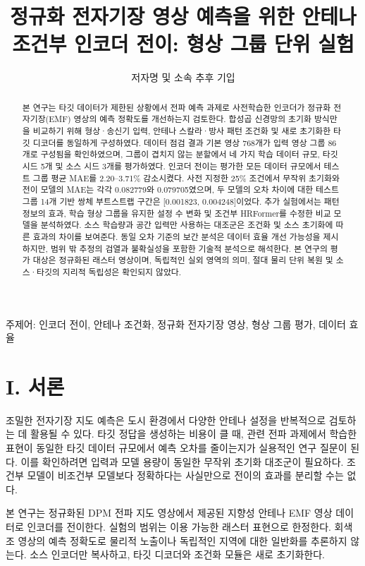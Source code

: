 \documentclass[10pt,a4paper]{article}
\title{정규화 전자기장 영상 예측을 위한 안테나 조건부 인코더 전이: 형상 그룹 단위 실험}
\author{저자명 및 소속 추후 기입}
\date{}
\begin{document}
\maketitle
\begin{abstract}
본 연구는 타깃 데이터가 제한된 상황에서 전파 예측 과제로 사전학습한 인코더가 정규화 전자기장(EMF) 영상의 예측 정확도를 개선하는지 검토한다. 합성곱 신경망의 초기화 방식만을 비교하기 위해 형상·송신기 입력, 안테나 스칼라·방사 패턴 조건화 및 새로 초기화한 타깃 디코더를 동일하게 구성하였다. 데이터 점검 결과 기본 영상 768개가 입력 영상 그룹 86개로 구성됨을 확인하였으며, 그룹이 겹치지 않는 분할에서 네 가지 학습 데이터 규모, 타깃 시드 5개 및 소스 시드 3개를 평가하였다. 인코더 전이는 평가한 모든 데이터 규모에서 테스트 그룹 평균 MAE를 2.20–3.71\% 감소시켰다. 사전 지정한 25\% 조건에서 무작위 초기화와 전이 모델의 MAE는 각각 0.082779와 0.079705였으며, 두 모델의 오차 차이에 대한 테스트 그룹 14개 기반 쌍체 부트스트랩 구간은 [0.001823, 0.004248]이었다. 추가 실험에서는 패턴 정보의 효과, 학습 형상 그룹을 유지한 설정 수 변화 및 조건부 HRFormer를 수정한 비교 모델을 분석하였다. 소스 학습량과 공간 입력만 사용하는 대조군은 조건화 및 소스 초기화에 따른 효과의 차이를 보여준다. 동일 오차 기준의 보간 분석은 데이터 효율 개선 가능성을 제시하지만, 범위 밖 추정의 검열과 불확실성을 포함한 기술적 분석으로 해석한다. 본 연구의 평가 대상은 정규화된 래스터 영상이며, 독립적인 실외 영역의 의미, 절대 물리 단위 복원 및 소스·타깃의 지리적 독립성은 확인되지 않았다.
\end{abstract}
\noindent 주제어: 인코더 전이, 안테나 조건화, 정규화 전자기장 영상, 형상 그룹 평가, 데이터 효율
\section*{I. 서론}
조밀한 전자기장 지도 예측은 도시 환경에서 다양한 안테나 설정을 반복적으로 검토하는 데 활용될 수 있다. 타깃 정답을 생성하는 비용이 클 때, 관련 전파 과제에서 학습한 표현이 동일한 타깃 데이터 규모에서 예측 오차를 줄이는지가 실용적인 연구 질문이 된다. 이를 확인하려면 입력과 모델 용량이 동일한 무작위 초기화 대조군이 필요하다. 조건부 모델이 비조건부 모델보다 정확하다는 사실만으로 전이의 효과를 분리할 수는 없다.

본 연구는 정규화된 DPM 전파 지도 영상에서 제공된 지향성 안테나 EMF 영상 데이터로 인코더를 전이한다. 실험의 범위는 이용 가능한 래스터 표현으로 한정한다. 회색조 영상의 예측 정확도로 물리적 노출이나 독립적인 지역에 대한 일반화를 추론하지 않는다. 소스 인코더만 복사하고, 타깃 디코더와 조건화 모듈은 새로 초기화한다.
\end{document}
